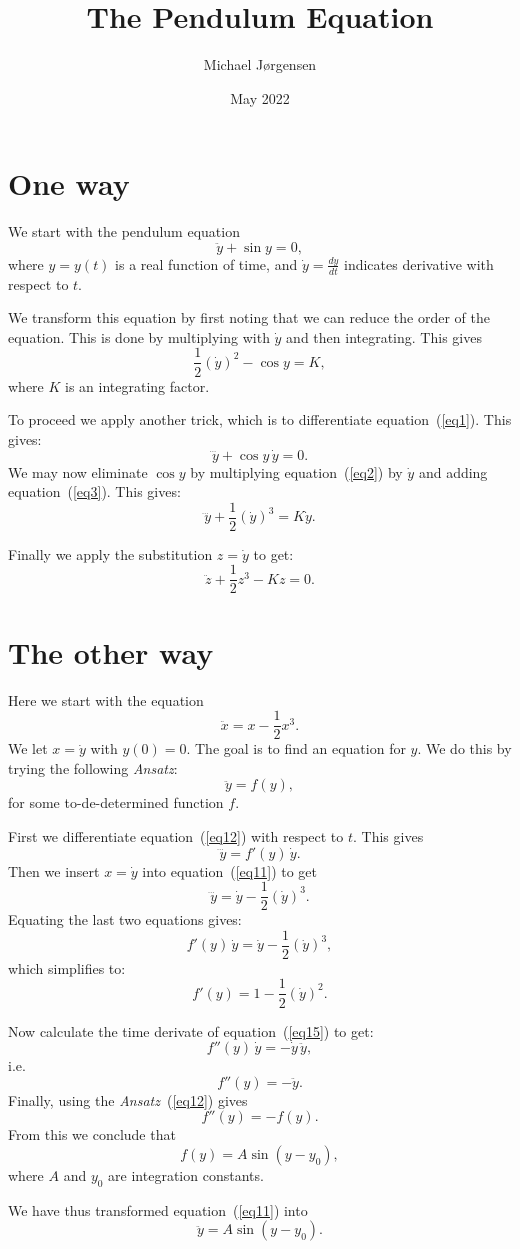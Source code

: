 \documentclass[12pt,oneside,a4paper]{article}
\title{The Pendulum Equation}
\date{May 2022}
\author{Michael Jørgensen}
\newcommand{\be}{\begin{equation}}
\newcommand{\ee}{\end{equation}}
\begin{document}
\maketitle

\section{One way}

We start with the pendulum equation
\be
\ddot y + \sin y = 0,
\label{eq1}
\ee
where $y=y(t)$ is a real function of time, and $\dot y = \frac{dy}{dt}$
indicates derivative with respect to $t$.

We transform this equation by first noting that we can reduce the order of the
equation. This is done by multiplying with $\dot y$ and then integrating.
This gives
\be
\frac12 (\dot y)^2 - \cos y = K,
\label{eq2}
\ee
where $K$ is an integrating factor.

To proceed we apply another trick, which is to differentiate
equation~(\ref{eq1}).  This gives:
\be
\dddot y + \cos y \,\dot y = 0.
\label{eq3}
\ee
We may now eliminate $\cos y$ by multiplying equation~(\ref{eq2}) by $\dot y$
and adding equation~(\ref{eq3}). This gives:
\be
\dddot y + \frac12 (\dot y)^3 = K\dot y.
\ee

Finally we apply the substitution $z=\dot y$ to get:
\be
\ddot z + \frac12 z^3 - Kz = 0.
\ee


\section{The other way}
Here we start with the equation
\be
\ddot x = x - \frac12 x^3.
\label{eq11}
\ee
We let $x = \dot y$ with $y(0) = 0$. The goal is to find an equation
for $y$. We do this by trying the following {\em Ansatz}:
\be
\ddot y = f(y),
\label{eq12}
\ee
for some to-de-determined function $f$.

First we differentiate equation~(\ref{eq12}) with respect to $t$.
This gives
\be
\dddot y = f'(y) \,\dot y.
\label{eq13}
\ee
Then we insert $x = \dot y$ into equation~(\ref{eq11}) to get
\be
\dddot y = \dot y - \frac12 (\dot y)^3.
\label{eq14}
\ee
Equating the last two equations gives:
\be
f'(y) \,\dot y = \dot y - \frac12 (\dot y)^3,
\ee
which simplifies to:
\be
f'(y) = 1 - \frac12 (\dot y)^2.
\label{eq15}
\ee

Now calculate the time derivate of equation~(\ref{eq15}) to get:
\be
f''(y) \,\dot y = -\dot y \,\ddot y,
\ee
i.e.
\be
f''(y) = - \ddot y.
\ee
Finally, using the {\em Ansatz}~(\ref{eq12}) gives
\be
f''(y) = -f(y).
\ee
From this we conclude that
\be
f(y) = A\sin(y-y_0),
\ee
where $A$ and $y_0$ are integration constants.

We have thus transformed equation~(\ref{eq11}) into
\be
\ddot y = A\sin(y-y_0).
\ee
\end{document}
